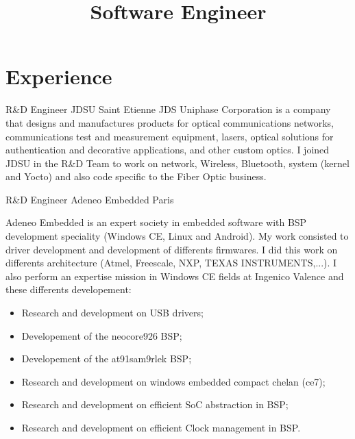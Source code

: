 \documentclass[11pt,a4paper,sans]{moderncv}
\title{Software Engineer}
\begin{document}
\makecvtitle

\section{Experience}

{R\&D Engineer}
{JDSU}
{Saint Etienne}
{}
{JDS Uniphase Corporation is a company that designs and manufactures products
for optical communications networks, communications test and measurement
equipment, lasers, optical solutions for authentication and decorative
applications, and other custom optics.
I joined JDSU in the R\&D Team to work on network, Wireless, Bluetooth,
system (kernel and Yocto) and also code specific to the Fiber Optic
business.}

{R\&D Engineer}
{Adeneo Embedded}
{Paris}
{}
{Adeneo Embedded is an expert society in embedded software with BSP
development speciality (Windows CE, Linux and Android).
My work consisted to driver development and development of differents
firmwares. I did this work on differents architecture (Atmel, Freescale,
NXP, TEXAS INSTRUMENTS,...).
I also perform an expertise mission in Windows CE fields at Ingenico
Valence and these differents developement:
\begin{itemize}
\item Research and development on USB drivers;
\item Developement of the neocore926 BSP;
\item Developement of the at91sam9rlek BSP;
\item Research and development on windows embedded compact chelan (ce7);
\item Research and development on efficient SoC abstraction in BSP;
\item Research and development on efficient Clock management in BSP.
\end{itemize}
}
\end{document}
